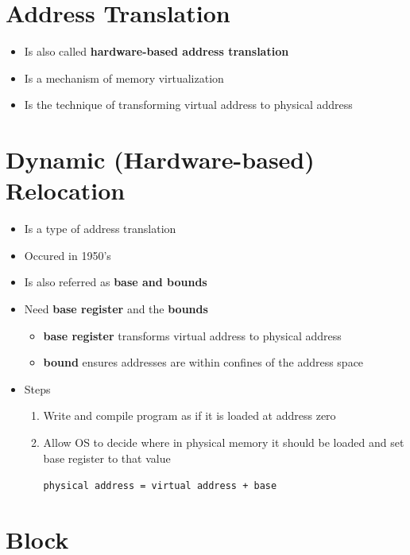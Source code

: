 \documentclass[12pt]{article}
\begin{document}
\section*{Address Translation}

\begin{itemize}
    \item Is also called \textbf{hardware-based address translation}
    \item Is a mechanism of memory virtualization
    \item Is the technique of transforming virtual address to physical address
\end{itemize}

\section*{Dynamic (Hardware-based) Relocation}

\begin{itemize}
    \item Is a type of address translation
    \item Occured in 1950's
    \item Is also referred as \textbf{base and bounds}
    \item Need \textbf{base register} and the \textbf{bounds}

    \begin{itemize}
        \item \textbf{base register} transforms virtual address to physical address
        \item \textbf{bound} ensures addresses are within confines of the address space
    \end{itemize}
    \item Steps

    \begin{enumerate}[1.]
        \item Write and compile program as if it is loaded at address zero
        \item Allow OS to decide where in physical memory it should be loaded
        and set base register to that value

        \bigskip

        \texttt{physical address = virtual address + base}
    \end{enumerate}
\end{itemize}


\section*{Block}
\end{document}
